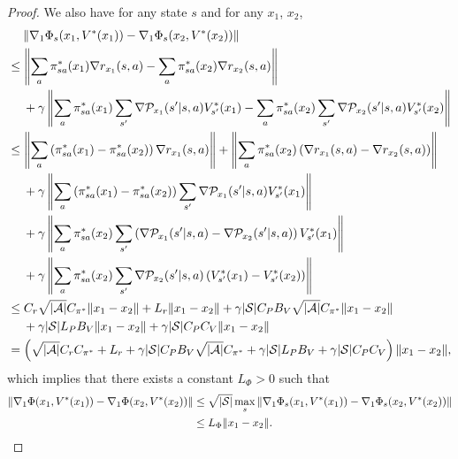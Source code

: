 \documentclass{article}
\theoremstyle{plain}
\theoremstyle{definition}
\theoremstyle{remark}
\def\cA{\mathcal A}
\def\cP{\mathcal P}
\def\cS{\mathcal S}
\begin{document}
\begin{proof}
    We also have for any state $s$ and for any $x_1$, $x_2$,
    \begin{align}
        &\quad\; \|\nabla_1 \Phi_s(x_1,V^*(x_1)) - \nabla_1 \Phi_s(x_2,V^*(x_2)) \| \notag\\
        & \leq\left\| \sum_a \pi^*_{sa}(x_1)  \nabla r_{x_1}(s,a) -\sum_a \pi^*_{sa}(x_2)  \nabla r_{x_2}(s,a) \right\|  \notag \\ 
        & \quad \; + \gamma \left\| \sum_a \pi^*_{sa}(x_1)  \sum_{s^\prime} \nabla \cP_{x_1}(s^\prime|s,a) V^*_{s^\prime}(x_1) - \sum_a \pi^*_{sa}(x_2)  \sum_{s^\prime} \nabla \cP_{x_2}(s^\prime|s,a) V^*_{s^\prime}(x_2) \right\| 
        \notag \\
        & \leq \left\| \sum_{a} \left( \pi^*_{sa}(x_1) - \pi^*_{sa}(x_2)\right)\nabla r_{x_1}(s,a) \right\| + \left\| \sum_a \pi^*_{sa}(x_2)  \left( \nabla r_{x_1}(s,a) - \nabla r_{x_2}(s,a) \right) \right\| 
       \notag \\
        & \quad \; + \gamma \left\| \sum_a \left( \pi^*_{sa}(x_1) - \pi^*_{sa}(x_2)\right)  \sum_{s^\prime} \nabla \cP_{x_1}(s^\prime|s,a) V^*_{s^\prime}(x_1) \right\| \notag\\
        & \quad \; + \gamma \left\| \sum_a \pi^*_{sa}(x_2)  \sum_{s^\prime} \left( \nabla \cP_{x_1}(s^\prime|s,a) - \nabla \cP_{x_2}(s^\prime|s,a) \right) V^*_{s^\prime}(x_1) \right\| \notag\\
        & \quad \; + \gamma \left\| \sum_a \pi^*_{sa}(x_2)  \sum_{s^\prime} \nabla \cP_{x_2}(s^\prime|s,a) \left( V^*_{s^\prime}(x_1) - V^*_{s^\prime}(x_2) \right) \right\| \notag\\
        & \leq C_r \sqrt{|\cA|} C_{\pi^*} \| x_1 - x_2 \|+ L_r \| x_1 - x_2 \| + \gamma |\cS| C_P B_V \sqrt{|\cA|} C_{\pi^*} \| x_1 - x_2 \|  \notag \\
        & \quad \; + \gamma |\cS| L_P B_V \| x_1 - x_2 \| + \gamma |\cS| C_P C_V \| x_1 - x_2 \| \notag \\
        & = \left( \sqrt{|\cA|} C_r C_{\pi^*} + L_r + \gamma |\cS| C_P B_V \sqrt{|\cA|} C_{\pi^*} + \gamma |\cS| L_P B_V + \gamma |\cS| C_P C_V \right) \| x_1 - x_2 \|, 
    \end{align}
    which implies that there exists a constant $L_\Phi >0$ such that
    \begin{align}
        \| \nabla_1 \Phi(x_1,V^*(x_1)) - \nabla_1 \Phi(x_2,V^*(x_2)) \| & \leq \sqrt{|\cS|} \max_{s} \|\nabla_1 \Phi_s(x_1,V^*(x_1)) - \nabla_1 \Phi_s(x_2,V^*(x_2)) \| \notag \\
        & \leq L_\Phi \| x_1 - x_2 \|.
    \end{align}


\end{proof}
\end{document}
